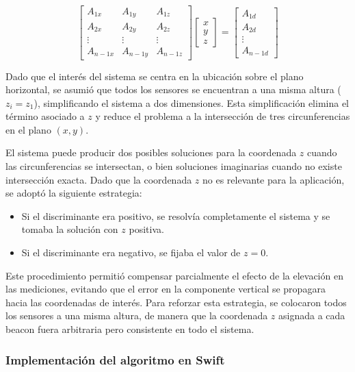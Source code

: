 \[
\begin{bmatrix}
A_{1x} & A_{1y} & A_{1z}\\
A_{2x} & A_{2y} & A_{2z} \\
\vdots & \vdots & \vdots \\
A_{n-1x} & A_{n-1y} & A_{n-1z}
\end{bmatrix}
\begin{bmatrix}
x \\ y \\ z
\end{bmatrix}
=
\begin{bmatrix}
A_{1d} \\ A_{2d} \\ \vdots \\ A_{n-1d}
\end{bmatrix}
\]


Dado que el interés del sistema se centra en la ubicación sobre el plano horizontal, se asumió que todos los sensores se encuentran a una misma altura ($z_i = z_1$), simplificando el sistema a dos dimensiones. Esta simplificación elimina el término asociado a $z$ y reduce el problema a la intersección de tres circunferencias en el plano $(x, y)$.

El sistema puede producir dos posibles soluciones para la coordenada $z$ cuando las circunferencias se intersectan, o bien soluciones imaginarias cuando no existe intersección exacta. Dado que la coordenada $z$ no es relevante para la aplicación, se adoptó la siguiente estrategia:
\begin{itemize}
  \item Si el discriminante era positivo, se resolvía completamente el sistema y se tomaba la solución con $z$ positiva.
  \item Si el discriminante era negativo, se fijaba el valor de $z = 0$.
\end{itemize}

Este procedimiento permitió compensar parcialmente el efecto de la elevación en las mediciones, evitando que el error en la componente vertical se propagara hacia las coordenadas de interés. Para reforzar esta estrategia, se colocaron todos los sensores a una misma altura, de manera que la coordenada $z$ asignada a cada beacon fuera arbitraria pero consistente en todo el sistema.

\subsubsection*{Implementación del algoritmo en Swift}

